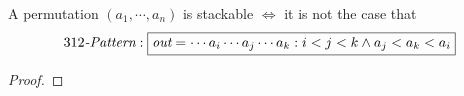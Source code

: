 \begin{frame}[fragile]{}
  \begin{theorem}
    A permutation $(a_1, \cdots, a_n)$ is stackable $\iff$ it is not the case that
    \[
      312\text{\it -Pattern}: \fbox{$\texttt{\it out} = \cdots a_i \cdots a_j \cdots a_k: i < j < k \land a_j < a_k < a_i$}
    \]
  \end{theorem}

  \vspace{0.30cm}
  \pause
  \begin{proof}
  \end{proof}

\end{frame}

% 

